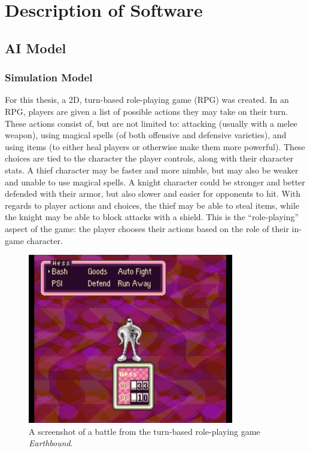 \chapter{Description of Software}
\section{AI Model}
\subsection{Simulation Model}
For this thesis, a 2D, turn-based role-playing game (RPG) was created. In an RPG, players are given a list of possible actions they may take on their turn. These actions consist of, but are not limited to: attacking (usually with a melee weapon), using magical spells (of both offensive and defensive varieties), and using items (to either heal players or otherwise make them more powerful). These choices are tied to the character the player controls, along with their character stats. A thief character may be faster and more nimble, but may also be weaker and unable to use magical spells. A knight character could be stronger and better defended with their armor, but also slower and easier for opponents to hit. With regards to player actions and choices, the thief may be able to steal items, while the knight may be able to block attacks with a shield. This is the ``role-playing'' aspect of the game: the player chooses their actions based on the role of their in-game character.\\

\begin{figure}[H]
  \centering
  \includegraphics[width=9cm]{figures/Earthbound.png}
  \caption{A screenshot of a battle from the turn-based role-playing game \textit{Earthbound}.}
  \label{fig:Earthbound}
\end{figure}

